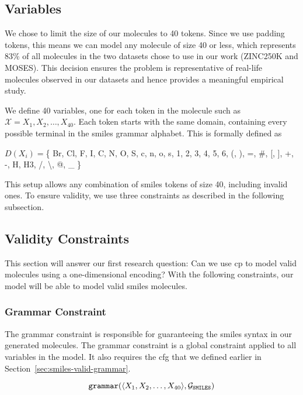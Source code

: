 \documentclass[../Document.tex]{subfiles}
\begin{document}
\subsection{Variables}
We chose to limit the size of our molecules to 40 tokens. Since we use padding tokens, this means we can model any molecule of size 40 or less, which represents 83\% of all molecules in the two datasets chose to use in our work (ZINC250K and MOSES).
This decision ensures the problem is representative of real-life molecules observed in our datasets and hence provides a meaningful empirical study.

We define 40 variables, one for each token in the molecule such as $\mathcal{X} = {X_1, X_2, \dots, X_{40}}$. Each token starts with the same domain, containing every possible terminal in the \gls{smiles} grammar alphabet.
This is formally defined as 
\begin{center}
$D(X_i) = $\{
    Br, Cl, F, I, C, N, O, S, c, n, o, s, 1, 2, 3, 4, 5, 6, (, ), =, \#, [, ], +, -, H, H3, /, \textbackslash, @, \_
\}
\end{center}

This setup allows any combination of \gls{smiles} tokens of size 40, including invalid ones. To ensure validity, we use three constraints as described in the following subsection.


\subsection{Validity Constraints}
\label{sec:validity-constraint-definition}
This section will answer our first research question: Can we use \acrshort{cp} to model valid molecules using a one-dimensional encoding?
With the following constraints, our model will be able to model valid \gls{smiles} molecules.

\subsubsection{Grammar Constraint}
The grammar constraint is responsible for guaranteeing the \gls{smiles} syntax in our generated molecules. The grammar constraint is a global constraint applied to all variables in the model. It also requires the \gls{cfg} that we defined earlier in Section~\ref{sec:smiles-valid-grammar}.

$$
    \texttt{grammar}(\langle X_1, X_2, \ldots, X_{40} \rangle, \mathcal{G}_{\texttt{SMILES}})\\
$$
\end{document}
